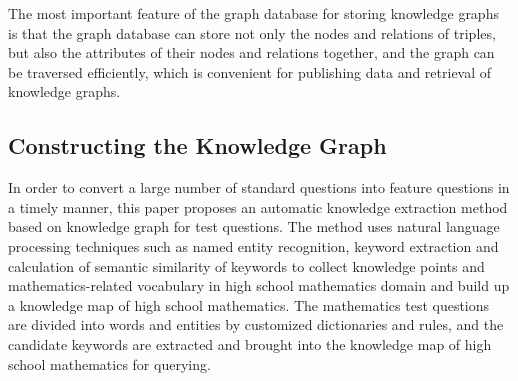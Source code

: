 \documentclass[11pt,en]{elegantpaper}
\begin{document}
The most important feature of the graph database for storing knowledge graphs is that the graph database can store not only the nodes and relations of triples, but also the attributes of their nodes and relations together, and the graph can be traversed efficiently, which is convenient for publishing data and retrieval of knowledge graphs.

\subsection{Constructing the Knowledge Graph}
In order to convert a large number of standard questions into feature questions in a timely manner, this paper proposes an automatic knowledge extraction method based on knowledge graph for test questions. The method uses natural language processing techniques such as named entity recognition, keyword extraction and calculation of semantic similarity of keywords to collect knowledge points and mathematics-related vocabulary in high school mathematics domain and build up a knowledge map of high school mathematics. The mathematics test questions are divided into words and entities by customized dictionaries and rules, and the candidate keywords are extracted and brought into the knowledge map of high school mathematics for querying.
\end{document}
